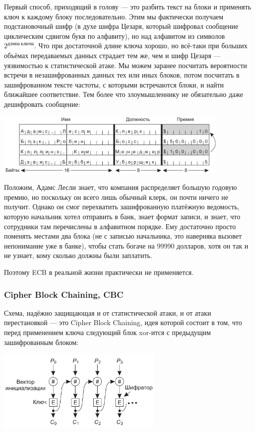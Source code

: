 \documentclass{../../text-style}
\begin{document}
Первый способ, приходящий в голову --- это разбить текст на блоки и применять ключ к каждому блоку последовательно. Этим мы фактически получаем подстановочный шифр (в духе шифра Цезаря, который шифровал сообщение циклическим сдвигом букв по алфавиту), но над алфавитом из символов $2^{длина\ ключа}$. Что при достаточной длине ключа хорошо, но всё-таки при больших объёмах передаваемых данных страдает тем же, чем и шифр Цезаря --- уязвимостью к статистической атаке. Мы можем заранее посчитать вероятности встречи в незашифрованных данных тех или иных блоков, потом посчитать в зашифрованном тексте частоты, с которыми встречаются блоки, и найти ближайшее соответствие. Тем более что злоумышленнику не обязательно даже дешифровать сообщение: 

\begin{center}
    \includegraphics[width=0.85\textwidth]{ecbAttack.png}
\end{center}

Положим, Адамс Лесли знает, что компания распределяет большую годовую премию, но поскольку он всего лишь обычный клерк, он почти ничего не получит. Однако он смог перехватить зашифрованную платёжную ведомость, которую начальник хотел отправить в банк, знает формат записи, и знает, что сотрудники там перечислены в алфавитном порядке. Ему достаточно просто поменять местами два блока (не с записью начальника, это наверняка вызовет непонимание уже в банке), чтобы стать богаче на 99990 долларов, хотя он так и не узнает, кому сколько должны были заплатить.

Поэтому ECB в реальной жизни практически не применяется.

\subsubsection{Cipher Block Chaining, CBC}

Схема, надёжно защищающая и от статистической атаки, и от атаки перестановкой --- это Cipher Block Chaining, идея которой состоит в том, что перед применением ключа следующий блок xor-ится с предыдущим зашифрованным блоком:

\begin{center}
    \includegraphics[width=0.6\textwidth]{cbc.png}
\end{center}
\end{document}
